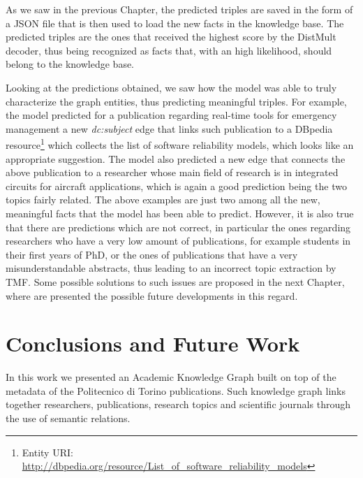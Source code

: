 \documentclass[%
    corpo=13.5pt,
    twoside,
    oldstyle,
    tipotesi=magistrale,
    greek,
    evenboxes
]{toptesi}
\begin{document}

As we saw in the previous Chapter, the predicted triples are saved in the
form of a JSON file that is then used to load the new facts in the knowledge
base.
The predicted triples are the ones that received the highest score by the
DistMult decoder, thus being recognized as facts that, with an high likelihood,
should belong to the knowledge base.

Looking at the predictions obtained, we saw how the model was able to
truly characterize the graph entities, thus predicting meaningful
triples.
For example, the model predicted for a publication regarding
real-time tools for emergency management a new \emph{dc:subject} edge that
links such publication to a DBpedia resource\footnote{Entity URI: \url{http://dbpedia.org/resource/List_of_software_reliability_models}}
which collects the list of
software reliability models, which looks like an appropriate suggestion.
The model also predicted a new edge that connects the above publication to a
researcher whose main field of research is in integrated circuits for aircraft
applications, which is again a good prediction being the two topics fairly
related.
The above examples are just two among all the new, meaningful facts that
the model has been able to predict.
However, it is also true that there are predictions which are not correct, in
particular the ones regarding researchers who have a very low amount of
publications, for example students in their first years of PhD, or the ones
of publications that have a very misunderstandable abstracts, thus leading to
an incorrect topic extraction by TMF.
Some possible solutions to such issues are proposed in the next Chapter, where
are presented the possible future developments in this regard.



\chapter{Conclusions and Future Work}

In this work we presented an Academic Knowledge Graph built on top of the
metadata of the Politecnico di Torino publications.
Such knowledge graph links together researchers, publications, research
topics and scientific journals through the use of semantic relations.
\end{document}
